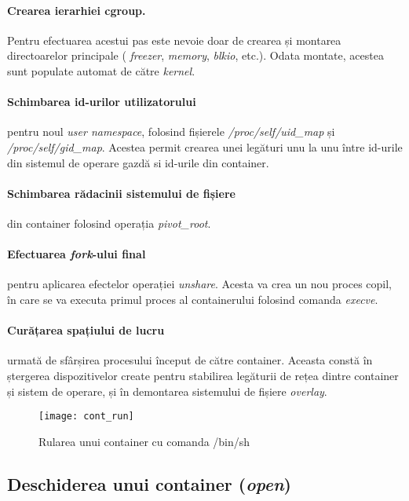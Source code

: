             \paragraph{Crearea ierarhiei cgroup.} Pentru efectuarea acestui pas este nevoie doar de crearea și montarea directoarelor principale ( \textit{freezer}, \textit{memory}, \textit{blkio}, etc.). Odata montate, acestea sunt populate automat de către \textit{kernel}.
            \paragraph{Schimbarea id-urilor utilizatorului} pentru noul \textit{user namespace}, folosind fișierele \textit{/proc/self/uid\_map} și \textit{/proc/self/gid\_map}. Acestea permit crearea unei legături unu la unu între id-urile din sistemul de operare gazdă si id-urile din container.
            \paragraph{Schimbarea rădacinii sistemului de fișiere} din container folosind operația \textit{pivot\_root}.
            \paragraph{Efectuarea \textit{fork}-ului final} pentru aplicarea efectelor operației \textit{unshare}. Acesta va crea un nou proces copil, în care se va executa primul proces al containerului folosind comanda \textit{execve}.
            \paragraph{Curățarea spațiului de lucru} urmată de sfârșirea procesului început de către container. Aceasta constă în ștergerea dispozitivelor create pentru stabilirea legăturii de rețea dintre container și sistem de operare, și în demontarea sistemului de fișiere \textit{overlay}.

            \begin{figure}[h!]
                \centering
                \texttt{[image: cont\_run]}
                \caption{Rularea unui container cu comanda /bin/sh}
                \label{fig:run}
            \end{figure}

        \subsection{Deschiderea unui container (\textit{open})}
